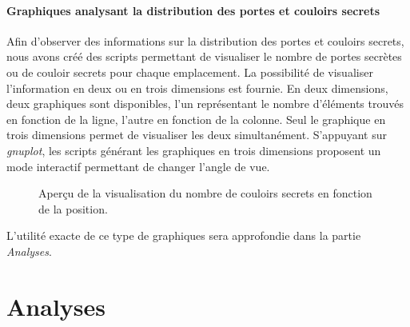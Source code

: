 \documentclass[a4paper,12pt]{article}
\begin{document}
\paragraph{Graphiques analysant la distribution des portes et couloirs secrets}
Afin d'observer des informations sur la distribution des portes et couloirs
secrets, nous avons créé des scripts permettant de visualiser le nombre de
portes secrètes ou de couloir secrets pour chaque emplacement. La possibilité de
visualiser l'information en deux ou en trois dimensions est fournie. En deux
dimensions, deux graphiques sont disponibles, l'un représentant le nombre
d'éléments trouvés en fonction de la ligne, l'autre en fonction de la colonne.
Seul le graphique en trois dimensions permet de visualiser les deux
simultanément. S'appuyant sur {\em gnuplot}, les scripts générant les graphiques
en trois dimensions proposent un mode interactif permettant de changer l'angle
de vue.

\begin{figure}[H]
  \caption{\label{fig:move_graph} Aperçu de la visualisation du nombre de
    couloirs secrets en fonction de la position.}
\end{figure}

L'utilité exacte de ce type de graphiques sera approfondie dans la partie
{\em Analyses}.


\section{Analyses}
\end{document}
